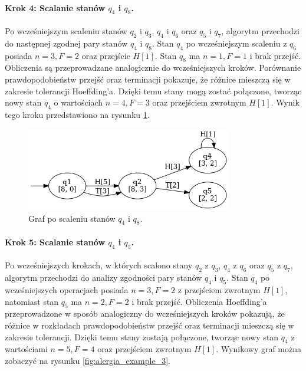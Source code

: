 \paragraph*{Krok 4: Scalanie stanów \( q_4 \) i \( q_8 \).}  
Po wcześniejszym scaleniu stanów \( q_2 \) i \( q_3 \), \( q_4 \) i \( q_6 \) oraz \( q_5 \) i \( q_7 \), algorytm przechodzi do następnej zgodnej pary stanów \( q_4 \) i \( q_8 \). Stan \( q_4 \) po wcześniejszym scaleniu z \( q_6 \) posiada \( n = 3, F = 2 \) oraz przejście \( H[1] \). Stan \( q_8 \) ma \( n = 1, F = 1 \) i brak przejść. Obliczenia są przeprowadzane analogicznie do wcześniejszych kroków. Porównanie prawdopodobieństw przejść oraz terminacji pokazuje, że różnice mieszczą się w zakresie tolerancji Hoeffding’a. Dzięki temu stany mogą zostać połączone, tworząc nowy stan \( q_4 \) o wartościach \( n = 4, F = 3 \) oraz przejściem zwrotnym \( H[1] \). Wynik tego kroku przedstawiono na rysunku \ref{fig:alergia_example_2}.  

\begin{figure}[ht]
    \centering
    \includegraphics[width=0.8\textwidth]{images/run_example/alergia/2.png}
    \caption{Graf po scaleniu stanów \( q_4 \) i \( q_8 \).}
    \label{fig:alergia_example_2}
\end{figure}  

\paragraph*{Krok 5: Scalanie stanów \( q_4 \) i \( q_5 \).}  
Po wcześniejszych krokach, w których scalono stany \( q_2 \) z \( q_3 \), \( q_4 \) z \( q_6 \) oraz \( q_5 \) z \( q_7 \), algorytm przechodzi do analizy zgodności pary stanów \( q_4 \) i \( q_5 \). Stan \( q_4 \) po wcześniejszych operacjach posiada \( n = 3, F = 2 \) z przejściem zwrotnym \( H[1] \), natomiast stan \( q_5 \) ma \( n = 2, F = 2 \) i brak przejść. Obliczenia Hoeffding’a przeprowadzone w sposób analogiczny do wcześniejszych kroków pokazują, że różnice w rozkładach prawdopodobieństw przejść oraz terminacji mieszczą się w zakresie tolerancji. Dzięki temu stany zostają połączone, tworząc nowy stan \( q_4 \) z wartościami \( n = 5, F = 4 \) oraz przejściem zwrotnym \( H[1] \). Wynikowy graf można zobaczyć na rysunku \ref{fig:alergia_example_3}.

